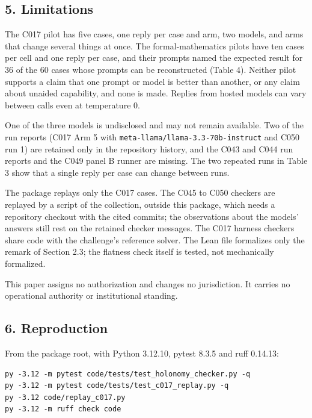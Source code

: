 \documentclass[
  11pt,
]{article}
\begin{document}
\subsection{5. Limitations}\label{limitations}

The C017 pilot has five cases, one reply per case and arm, two models,
and arms that change several things at once. The formal-mathematics
pilots have ten cases per cell and one reply per case, and their prompts
named the expected result for 36 of the 60 cases whose prompts can be
reconstructed (Table 4). Neither pilot supports a claim that one prompt
or model is better than another, or any claim about unaided capability,
and none is made. Replies from hosted models can vary between calls even
at temperature 0.

One of the three models is undisclosed and may not remain available. Two
of the run reports (C017 Arm 5 with
\nolinkurl{meta-llama/llama-3.3-70b-instruct} and C050 run 1) are
retained only in the repository history, and the C043 and C044 run
reports and the C049 panel B runner are missing. The two repeated runs
in Table 3 show that a single reply per case can change between runs.

The package replays only the C017 cases. The C045 to C050 checkers are
replayed by a script of the collection, outside this package, which
needs a repository checkout with the cited commits; the observations
about the models' answers still rest on the retained checker messages.
The C017 harness checkers share code with the challenge's reference
solver. The Lean file formalizes only the remark of Section 2.3; the
flatness check itself is tested, not mechanically formalized.

This paper assigns no authorization and changes no jurisdiction. It
carries no operational authority or institutional standing.

\subsection{6. Reproduction}\label{reproduction}

From the package root, with Python 3.12.10, pytest 8.3.5 and ruff
0.14.13:

\begin{lstlisting}
py -3.12 -m pytest code/tests/test_holonomy_checker.py -q
py -3.12 -m pytest code/tests/test_c017_replay.py -q
py -3.12 code/replay_c017.py
py -3.12 -m ruff check code
\end{lstlisting}
\end{document}
